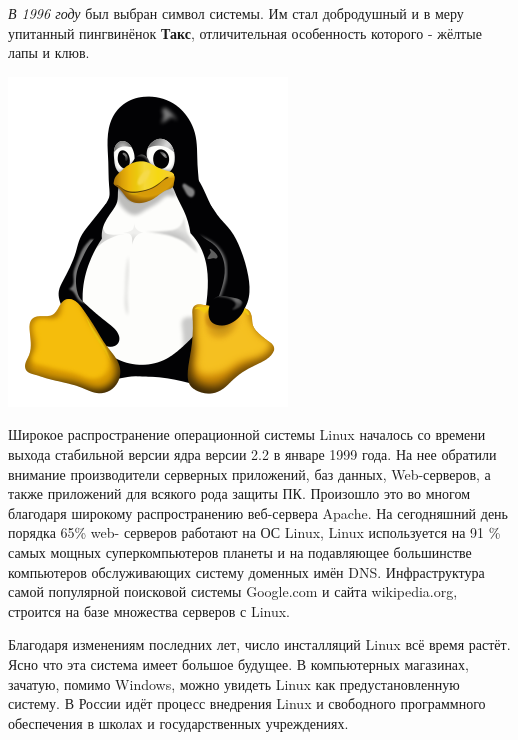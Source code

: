 \documentclass[14pt]{beamer}
\begin{document}
\begin{frame}
\begin{block}

\textsl{В 1996 году} был выбран символ системы. Им 
стал добродушный и в меру упитанный пингвинёнок 
\textbf{Такс}, отличительная особенность которого - 
жёлтые лапы и клюв.

\centering
\includegraphics[scale=0.35]{Tux.png}
\end{block}
\end{frame}

\begin{frame}[shrink=10]
\begin{block}

Широкое распространение операционной системы Linux 
началось со времени выхода стабильной версии ядра 
версии 2.2 в январе 1999 года. На нее обратили 
внимание производители серверных приложений, баз 
данных, Web-серверов, а также приложений для 
всякого рода защиты ПК. Произошло это во многом 
благодаря широкому распространению веб-сервера 
Apache. На сегодняшний день порядка 65\% web-
серверов работают на ОС Linux, Linux используется 
на 91 \% самых мощных суперкомпьютеров планеты и на 
подавляющее большинстве компьютеров обслуживающих 
систему доменных имён DNS. Инфраструктура самой 
популярной поисковой системы Google.com и сайта 
wikipedia.org, строится на базе множества серверов 
с Linux.
\end{block}
\end{frame}

\begin{frame}[shrink=10]
\begin{block}

Благодаря изменениям последних лет, число 
инсталляций Linux всё время растёт. Ясно что эта 
система имеет большое будущее. В компьютерных 
магазинах, зачатую, помимо Windows, можно увидеть 
Linux как предустановленную систему. В России идёт 
процесс внедрения Linux и свободного программного 
обеспечения в школах и государственных учреждениях.
\end{block}
\end{frame}
\end{document}
